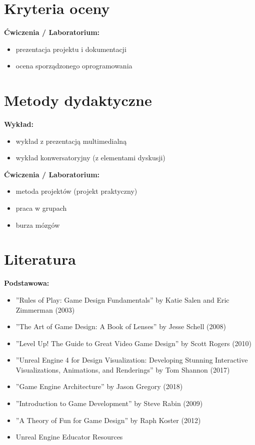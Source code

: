 \documentclass[12pt, a4paper]{article}
\begin{document}
\section{Kryteria oceny}

\textbf{Ćwiczenia / Laboratorium:}
\begin{itemize}
  \item prezentacja projektu i dokumentacji
  \item ocena sporządzonego oprogramowania
\end{itemize}


\section{Metody dydaktyczne}

\textbf{Wykład:}
\begin{itemize}
  \item wykład z prezentacją multimedialną
  \item wykład konwersatoryjny (z elementami dyskusji)
\end{itemize}
\vspace{4pt}
\textbf{Ćwiczenia / Laboratorium:}
\begin{itemize}
  \item metoda projektów (projekt praktyczny)
  \item praca w grupach
  \item burza mózgów
\end{itemize}
\vspace{4pt}


\section{Literatura}

\textbf{Podstawowa:}
\begin{itemize}
  \item ''Rules of Play: Game Design Fundamentals'' by Katie Salen and Eric Zimmerman (2003)
  \item ''The Art of Game Design: A Book of Lenses'' by Jesse Schell (2008)
  \item ''Level Up! The Guide to Great Video Game Design'' by Scott Rogers (2010)
  \item ''Unreal Engine 4 for Design Visualization: Developing Stunning Interactive Visualizations, Animations, and Renderings'' by Tom Shannon (2017)
  \item ''Game Engine Architecture'' by Jason Gregory (2018)
  \item ''Introduction to Game Development'' by Steve Rabin (2009)
  \item ''A Theory of Fun for Game Design'' by Raph Koster (2012)
  \item Unreal Engine Educator Resources
\end{itemize}
\end{document}
